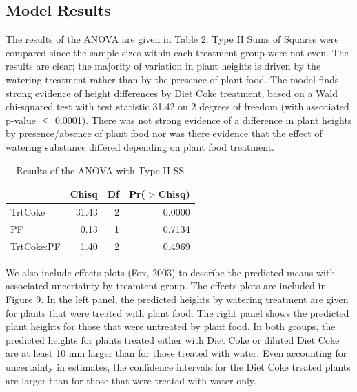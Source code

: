 \documentclass[1p,12pt]{elsarticle}\usepackage[]{graphicx}\usepackage[]{color}
\begin{document}
\subsection{Model Results}

The results of the ANOVA are given in Table 2. Type II Sums of Squares were compared since the sample sizes within each treatment group were not even.  The results are clear; the majority of variation in plant heights is driven by the watering treatment rather than by the presence of plant food.  The model finds strong evidence of height differences by Diet Coke treatment, based on a Wald chi-squared test with test statistic 31.42 on 2 degrees of freedom (with associated p-value $\leq$ 0.0001). There was not strong evidence of a difference in plant heights by presence/absence of plant food nor was there evidence that the effect of watering substance differed depending on plant food treatment. 

\begin{table}[ht]
\centering
\begin{tabular}{lrrr}
  \hline
 & Chisq & Df & Pr($>$Chisq) \\ 
  \hline
TrtCoke & 31.43 & 2 & 0.0000 \\ 
  PF & 0.13 & 1 & 0.7134 \\ 
  TrtCoke:PF & 1.40 & 2 & 0.4969 \\ 
   \hline
\end{tabular}
\caption{Results of the ANOVA with Type II SS}
\end{table}
 

We also include effects plots (Fox, 2003) to describe the predicted means with associated uncertainty by treamtent group. The effects plots are included in Figure 9. In the left panel, the predicted heights by watering treatment are given for plants that were treated with plant food. The right panel shows the predicted plant heights for those that were untreated by plant food. In both groups, the predicted heights for plants treated either with Diet Coke or diluted Diet Coke are at least 10 mm larger than for those treated with water. Even accounting for uncertainty in estimates, the confidence intervals for the Diet Coke treated plants are larger than for those that were treated with water only.  
\end{document}
